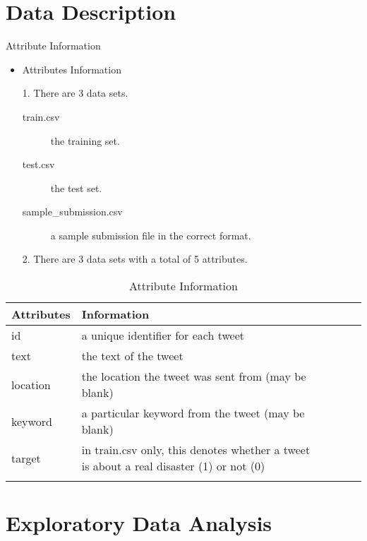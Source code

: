 \documentclass[
 size=12pt,
 paper=smartboard, %
 mode=present, %
 display=slides, %
 style=tuliplab,  %
 pauseslide,
 fleqn,leqno,clock]{powerdot}
\begin{document}
\section{Data Description}
%
\begin{slide}{Attribute Information}
  \begin{itemize}
    \item<1->
          Attributes Information
    \item[1.]
          There are 3 data sets.
    \begin{description}
    	\item[train.csv] the training set.
    	\item[test.csv] the test set.
    	\item[sample\_submission.csv] a sample submission file in the correct format.
    \end{description}
    \item[2.]
          There are 3 data sets with a total of 5 attributes.
\end{itemize}
\begin{table}[htbp]
	\centering
	\caption{Attribute Information}
	\begin{tabular}{llllll}
	\hline
	Attributes & Information                                                                            \\
	\hline
	id   & a unique identifier for each tweet                                                               \\
	text    & the text of the tweet                                                                         \\
	location     & the location the tweet was sent from (may be blank)                                      \\
	keyword     & a particular keyword from the tweet (may be blank)                                        \\
	target    &  in train.csv only, this denotes whether a tweet is about a real disaster (1) or not (0)    \\                                               \\
	\hline
\end{tabular}
\end{table}
\end{slide}


\section{Exploratory Data Analysis}
\end{document}
